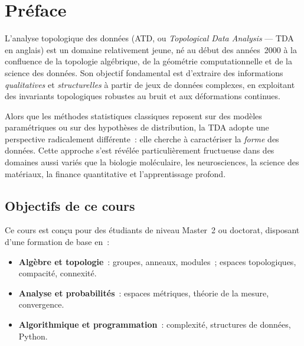 \chapter*{Pr\'eface}

L'analyse topologique des donn\'ees (ATD, ou \emph{Topological Data Analysis} --- TDA
en anglais) est un domaine relativement jeune, n\'e au d\'ebut des ann\'ees~2000
\`a la confluence de la topologie alg\'ebrique, de la g\'eom\'etrie computationnelle
et de la science des donn\'ees. Son objectif fondamental est d'extraire des
informations \emph{qualitatives} et \emph{structurelles} \`a partir de jeux de
donn\'ees complexes, en exploitant des invariants topologiques robustes au bruit
et aux d\'eformations continues.

\medskip

Alors que les m\'ethodes statistiques classiques reposent sur des mod\`eles
param\'etriques ou sur des hypoth\`eses de distribution, la TDA adopte une
perspective radicalement diff\'erente~: elle cherche \`a caract\'eriser la
\emph{forme} des donn\'ees. Cette approche s'est r\'ev\'el\'ee particuli\`erement
fructueuse dans des domaines aussi vari\'es que la biologie mol\'eculaire,
les neurosciences, la science des mat\'eriaux, la finance quantitative et
l'apprentissage profond.

\section*{Objectifs de ce cours}

Ce cours est con\c{c}u pour des \'etudiants de niveau Master~2 ou doctorat,
disposant d'une formation de base en~:
\begin{itemize}
  \item \textbf{Alg\`ebre et topologie}~: groupes, anneaux, modules~;
        espaces topologiques, compacit\'e, connexit\'e.
  \item \textbf{Analyse et probabilit\'es}~: espaces m\'etriques, th\'eorie de
        la mesure, convergence.
  \item \textbf{Algorithmique et programmation}~: complexit\'e, structures de
        donn\'ees, Python.
\end{itemize}

